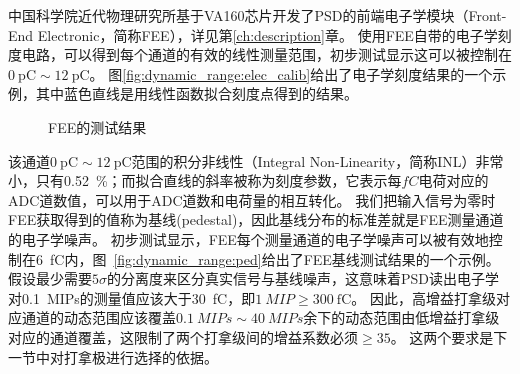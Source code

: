 中国科学院近代物理研究所基于VA160芯片开发了PSD的前端电子学模块（Front-End Electronic，简称FEE），详见第\ref{ch:description}章。
使用FEE自带的电子学刻度电路，可以得到每个通道的有效的线性测量范围，初步测试显示这可以被控制在$\SI{0}{\pico\coulomb}\sim\SI{12}{\pico\coulomb}$。
图\ref{fig:dynamic_range:elec_calib}给出了电子学刻度结果的一个示例，其中蓝色直线是用线性函数拟合刻度点得到的结果。
\begin{figure}[htb]
\centering
{}
{}
\caption{FEE的测试结果}
\label{fig:dynamic_range:fee_test}
\end{figure}
该通道$\SI{0}{\pico\coulomb}\sim\SI{12}{\pico\coulomb}$范围的积分非线性（Integral Non-Linearity，简称INL）非常小，只有\SI{0.52}{\percent}；而拟合直线的斜率被称为刻度参数，它表示每$fC$电荷对应的ADC道数值，可以用于ADC道数和电荷量的相互转化。
我们把输入信号为零时FEE获取得到的值称为基线(pedestal)，因此基线分布的标准差就是FEE测量通道的电子学噪声。
初步测试显示，FEE每个测量通道的电子学噪声可以被有效地控制在\SI{6}{\femto\coulomb}内，图~\ref{fig:dynamic_range:ped}给出了FEE基线测试结果的一个示例。
假设最少需要$5\sigma$的分离度来区分真实信号与基线噪声，这意味着PSD读出电子学对\SI{0.1}{MIPs}的测量值应该大于\SI{30}{\femto\coulomb}，即$\SI{1}{MIP} \ge \SI{300}{\femto\coulomb}$。
因此，高增益打拿级对应通道的动态范围应该覆盖$\SI{0.1}{MIPs}\sim\SI{40}{MIPs}$余下的动态范围由低增益打拿级对应的通道覆盖，这限制了两个打拿级间的增益系数必须$\ge 35$。
这两个要求是下一节中对打拿极进行选择的依据。


